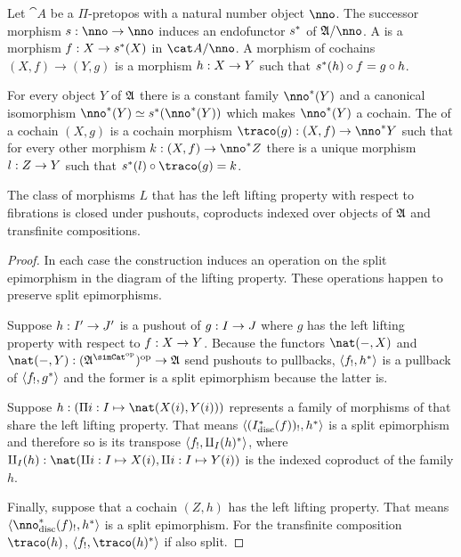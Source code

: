 \documentclass[csh.tex]{subfiles}
\begin{document}
\begin{definition} Let $\cat A$ be a $\Pi$-pretopos with a natural number object $\nno$. The successor morphism $s\of\nno\to\nno$ induces an endofunctor $s^*$ of $\ambient/\nno$. A  is a morphism $f: X\to s^*(X)$ in $\cat A/\nno$. A morphism of cochains $(X,f)\to(Y,g)$ is a morphism $h: X\to Y$ such that $s^*(h)\circ f = g\circ h$.

For every object $Y$ of $\mathfrak A$ there is a constant family $\nno\ri(Y)$ and a canonical isomorphism $\nno\ri(Y)\simeq s\ri(\nno\ri(Y))$ which makes $\nno\ri(Y)$ a cochain. The  of a cochain $(X,g)$ is a cochain morphism $\traco(g)\of (X,f)\to\nno\ri Y$ such that for every other morphism $k\of (X,f)\to\nno\ri Z$ there is a unique morphism $l: Z\to Y$ such that $s\ri(l)\circ \traco(g)=k$.
\end{definition}

\begin{lemma} The class of morphisms $L$ that has the left lifting property with respect to fibrations is closed under pushouts, coproducts indexed over objects of $\mathfrak A$ and transfinite compositions. \label{saturation}\end{lemma}

\begin{proof}
In each case the construction induces an operation on the split epimorphism in the diagram of the lifting property. These operations happen to preserve split epimorphisms.

Suppose $h: I'\to J'$ is a pushout of $g: I\to J$ where $g$ has the left lifting property with respect to $f: X\to Y$. Because the functors $\nat(-,X)$ and $\nat(-,Y)\of(\ambient\s)\dual\to\ambient$ send pushouts to pullbacks, $\left\langle f_!,h^* \right\rangle$ is a pullback of $\left\langle f_!,g^* \right\rangle$ and the former is a split epimorphism because the latter is.

Suppose $h\of(\product{i\of I}{\nat(X(i),Y(i))})$ represents a family of morphisms of that share the left lifting property. That means $\left\langle (I_{\rm disc}^*(f))_!,h^* \right\rangle$ is a split epimorphism and therefore so is its transpose $\left\langle f_!,\amalg_I(h)^* \right\rangle$, where $\amalg_I(h)\of\nat(\coproduct{i\of I}{X(i)},\coproduct{i\of I}{Y(i)})$ is the indexed coproduct of the family $h$.%

Finally, suppose that a cochain $(Z,h)$ has the left lifting property. That means $\tuplet{\nno\disc\ri(f)_!,h\ri}$ is a split epimorphism. For the transfinite composition $\traco(h)$, $\tuplet{f_!,\traco(h)\ri}$ if also split.
\end{proof}
\end{document}
